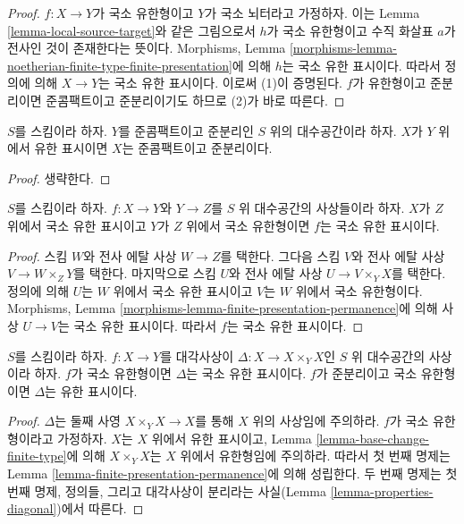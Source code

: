 \begin{proof}
$f : X \to Y$가 국소 유한형이고 $Y$가 국소 뇌터라고 가정하자.
이는 Lemma \ref{lemma-local-source-target}와 같은 그림으로서
$h$가 국소 유한형이고 수직 화살표 $a$가 전사인 것이
존재한다는 뜻이다. Morphisms, Lemma
\ref{morphisms-lemma-noetherian-finite-type-finite-presentation}에 의해
$h$는 국소 유한 표시이다.
따라서 정의에 의해 $X \to Y$는 국소 유한 표시이다.
이로써 (1)이 증명된다. $f$가 유한형이고 준분리이면
준콤팩트이고 준분리이기도 하므로 (2)가 바로 따른다.
\end{proof}

\begin{lemma}
\label{lemma-finite-presentation-quasi-compact-quasi-separated}
$S$를 스킴이라 하자. $Y$를 준콤팩트이고 준분리인
$S$ 위의 대수공간이라 하자. $X$가 $Y$ 위에서 유한 표시이면
$X$는 준콤팩트이고 준분리이다.
\end{lemma}

\begin{proof}
생략한다.
\end{proof}

\begin{lemma}
\label{lemma-finite-presentation-permanence}
$S$를 스킴이라 하자.
$f : X \to Y$와 $Y \to Z$를 $S$ 위 대수공간의 사상들이라 하자.
$X$가 $Z$ 위에서 국소 유한 표시이고 $Y$가 $Z$ 위에서
국소 유한형이면 $f$는 국소 유한 표시이다.
\end{lemma}

\begin{proof}
스킴 $W$와 전사 에탈 사상 $W \to Z$를 택한다.
그다음 스킴 $V$와 전사 에탈 사상 $V \to W \times_Z Y$를 택한다.
마지막으로 스킴 $U$와 전사 에탈 사상
$U \to V \times_Y X$를 택한다. 정의에 의해 $U$는 $W$ 위에서
국소 유한 표시이고 $V$는 $W$ 위에서 국소 유한형이다.
Morphisms, Lemma
\ref{morphisms-lemma-finite-presentation-permanence}에 의해
사상 $U \to V$는 국소 유한 표시이다.
따라서 $f$는 국소 유한 표시이다.
\end{proof}

\begin{lemma}
\label{lemma-diagonal-morphism-finite-type}
$S$를 스킴이라 하자. $f : X \to Y$를 대각사상이
$\Delta : X \to X \times_Y X$인 $S$ 위 대수공간의 사상이라 하자.
$f$가 국소 유한형이면 $\Delta$는 국소 유한 표시이다.
$f$가 준분리이고 국소 유한형이면 $\Delta$는 유한 표시이다.
\end{lemma}

\begin{proof}
$\Delta$는 둘째 사영 $X \times_Y X \to X$를 통해
$X$ 위의 사상임에 주의하라. $f$가 국소 유한형이라고 가정하자.
$X$는 $X$ 위에서 유한 표시이고, Lemma
\ref{lemma-base-change-finite-type}에 의해
$X \times_Y X$는 $X$ 위에서 유한형임에 주의하라.
따라서 첫 번째 명제는 Lemma
\ref{lemma-finite-presentation-permanence}에 의해 성립한다.
두 번째 명제는 첫 번째 명제, 정의들, 그리고 대각사상이 분리라는
사실(Lemma \ref{lemma-properties-diagonal})에서 따른다.
\end{proof}


